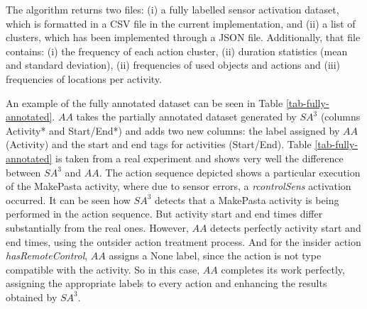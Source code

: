 The algorithm returns two files: (i) a fully labelled sensor activation dataset, which is formatted in a CSV file in the current implementation, and (ii) a list of clusters, which has been implemented through a JSON file. Additionally, that file contains: (i) the frequency of each action cluster, (ii) duration statistics (mean and standard deviation), (ii) frequencies of used objects and actions and (iii) frequencies of locations per activity. 

An example of the fully annotated dataset can be seen in Table \ref{tab-fully-annotated}. $AA$ takes the partially annotated dataset generated by $SA^3$ (columns Activity* and Start/End*) and adds two new columns: the label assigned by $AA$ (Activity) and the start and end tags for activities (Start/End). Table \ref{tab-fully-annotated} is taken from a real experiment and shows very well the difference between $SA^3$ and $AA$. The action sequence depicted shows a particular execution of the MakePasta activity, where due to sensor errors, a \textit{rcontrolSens} activation occurred. It can be seen how $SA^3$ detects that a MakePasta activity is being performed in the action sequence. But activity start and end times differ substantially from the real ones. However, $AA$ detects perfectly activity start and end times, using the outsider action treatment process. And for the insider action \textit{hasRemoteControl}, $AA$ assigns a None label, since the action is not type compatible with the activity. So in this case, $AA$ completes its work perfectly, assigning the appropriate labels to every action and enhancing the results obtained by $SA^3$.

\begin{comment}
\begin{figure}[htbp]
\begin{scriptsize}
\begin{lstlisting}
2014-05-23 13:34:09.590934,storeSens,openStore,None,,MakePasta,start
2014-05-23 13:34:15.976283,potSens,useCookingUtensil,MakePasta,start,MakePasta,
2014-05-23 13:34:35.067066,ktapSens,turnOnTap,MakePasta,,MakePasta,
2014-05-23 13:35:01.608632,cookerSens,useCookingAppliance,MakePasta,,MakePasta,
2014-05-23 13:35:59.858079,rcontrolSens,hasRemoteControl,MakePasta,,None,
2014-05-23 13:36:15.475288,macaroniSens,hasPasta,MakePasta,end,MakePasta,
2014-05-23 13:45:15.485760,drainerSens,useCookingUtensil,None,,MakePasta,
2014-05-23 13:45:54.969772,fridgeSens,openFridge,None,,MakePasta,
2014-05-23 13:46:00.132993,baconSens,hasBacon,None,,MakePasta,
2014-05-23 13:46:05.764809,creamSens,hasCream,None,,MakePasta,end
\end{lstlisting}
\end{scriptsize}
\caption{Example of a fully annotated dataset, one of the outputs of the $AA$ algorithm.}
\label{fig-fully-annotated}
\end{figure}
\end{comment}

